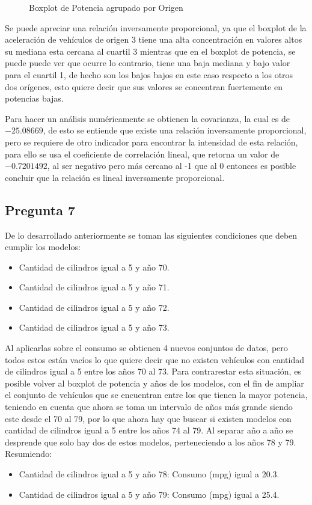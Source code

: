\documentclass[letter,10pt]{article}
\begin{document}
\begin{minipage}{\linewidth}
\begin{minipage}{0.45\linewidth}
\begin{figure}[H]
              \caption{Boxplot de Potencia agrupado por Origen}
          \end{figure}
      \end{minipage}
  \end{minipage}
Se puede apreciar una relación inversamente proporcional, ya que el boxplot de la aceleración de vehículos de origen 3 tiene una alta concentración en valores altos
su mediana esta cercana al cuartil 3 mientras que en el boxplot de potencia, se puede puede ver que ocurre lo contrario, tiene una baja mediana y bajo valor para el cuartil 1,
de hecho son los bajos bajos en este caso respecto a los otros dos orígenes, esto quiere decir que sus valores se concentran fuertemente en potencias bajas.
  
  
Para hacer un análisis numéricamente se obtienen la covarianza, la cual es de $-25.08669$, de esto se entiende que existe una relación inversamente proporcional,
pero se requiere de otro indicador para encontrar la intensidad de esta relación, para ello se usa el coeficiente de correlación lineal, que retorna un valor de 
$-0.7201492$, al ser negativo pero más cercano al -1 que al 0 entonces es posible concluir que la relación es lineal inversamente proporcional.

\newpage
\subsection{Pregunta 7}

De lo desarrollado anteriormente se toman las siguientes condiciones que deben cumplir los modelos:
\begin{itemize}
 \item Cantidad de cilindros igual a 5 y año 70.
 \item Cantidad de cilindros igual a 5 y año 71.
 \item Cantidad de cilindros igual a 5 y año 72.
 \item Cantidad de cilindros igual a 5 y año 73.
\end{itemize}

Al aplicarlas sobre el consumo se obtienen 4 nuevos conjuntos de datos, pero todos estos están vacíos lo que quiere decir que no existen vehículos
con cantidad de cilindros igual a 5 entre los años 70 al 73. Para contrarestar esta situación, es posible volver al boxplot de potencia y años de los modelos, 
con el fin de ampliar el conjunto de vehículos que se encuentran entre los que tienen la mayor potencia, teniendo en cuenta que ahora se toma un intervalo de años
más grande siendo este desde el 70 al 79, por lo que ahora hay que buscar si existen modelos con cantidad de cilindros igual a 5 entre los años 74 al 79. Al separar año
a año se desprende que solo hay dos de estos modelos, perteneciendo a los años 78 y 79. Resumiendo:
\begin{itemize}
 \item Cantidad de cilindros igual a 5 y año 78: Consumo (mpg) igual a 20.3.
 \item Cantidad de cilindros igual a 5 y año 79: Consumo (mpg) igual a 25.4.
\end{itemize}
\end{document}
